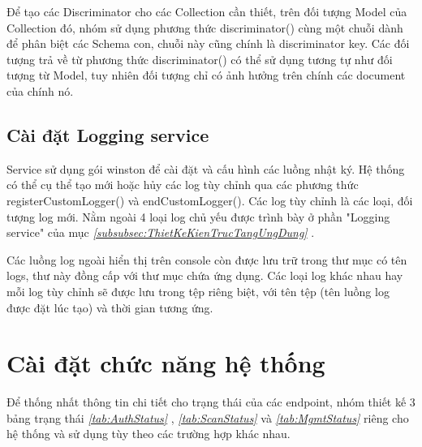Để tạo các Discriminator cho các Collection cần thiết, trên đối tượng Model của Collection đó, nhóm sử dụng phương thức discriminator() cùng một chuỗi dành để phân biệt các Schema con, chuỗi này cũng chính là discriminator key. Các đối tượng trả về từ phương thức discriminator() có thể sử dụng tương tự như đối tượng từ Model, tuy nhiên đối tượng chỉ có ảnh hưởng trên chính các document của chính nó.

\subsection{Cài đặt Logging service}

\tab Service sử dụng gói winston để cài đặt và cấu hình các luồng nhật ký.
Hệ thống có thể cụ thể tạo mới hoặc hủy các log tùy chỉnh qua các phương thức registerCustomLogger() và endCustomLogger().
Các log tùy chỉnh là các loại, đối tượng log mới.
Nằm ngoài 4 loại log chủ yếu được trình bày ở phần "Logging service" của mục \textit{\ref{subsubsec:ThietKeKienTrucTangUngDung} }.

Các luồng log ngoài hiển thị trên console còn được lưu trữ trong thư mục có tên logs, thư này đồng cấp với thư mục chứa ứng dụng.
Các loại log khác nhau hay mỗi log tùy chỉnh sẽ được lưu trong tệp riêng biệt, với tên tệp (tên luồng log được đặt lúc tạo) và thời gian tương ứng.

\section{Cài đặt chức năng hệ thống} \label{sec:CaiDatChucNangHeThong}

\tab Để thống nhất thông tin chi tiết cho trạng thái của các endpoint, nhóm thiết kế 3 bảng trạng thái 
\textit{\ref{tab:AuthStatus} }
, \textit{\ref{tab:ScanStatus} } 
và \textit{\ref{tab:MgmtStatus} } 
riêng cho hệ thống và sử dụng tùy theo các trường hợp khác nhau.

